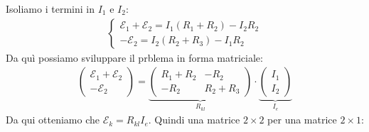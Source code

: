 \documentclass[a4paper, oneside]{article}
\begin{document}
Isoliamo i termini in $I_1$ e $I_2$:
\begin{gather*}
    \begin{cases}
        \mathcal{E}_1 + \mathcal{E}_2 = I_1 (R_1 + R_2) - I_2 R_2\\
        -\mathcal{E}_2 = I_2 (R_2 + R_3) - I_1 R_2
    \end{cases}
\end{gather*}
Da quì possiamo sviluppare il prblema in forma matriciale:
\begin{gather*}
    \begin{pmatrix}
        \mathcal{E}_1 + \mathcal{E}_2\\
        -\mathcal{E}_2
    \end{pmatrix} = \underbrace{\begin{pmatrix}
        R_1 + R_2 & -R_2\\
        -R_2 & R_2 + R_3
    \end{pmatrix}}_{R_{kl}} \cdot
    \underbrace{\begin{pmatrix}
        I_1\\
        I_2
    \end{pmatrix}}_{I_e}
\end{gather*}
Da qui otteniamo che $\mathcal{E}_k = R_{kl} I_e$. Quindi una matrice $2\times2$ per una matrice $2\times1$:\\
\end{document}
